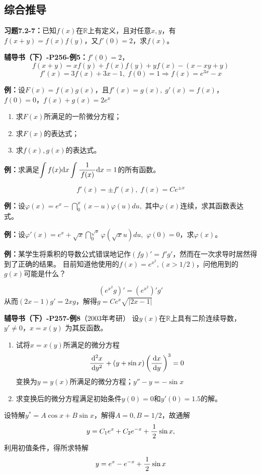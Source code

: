 \subsection{综合推导}

{\bf 习题7.2-7：}已知$f(x)$在$\mathbb{R}$上有定义，且对任意$x,y$，有
$f(x+y)=f(x)f(y)$，又$f'(0)=2$，求$f(x)$。

{\bf 辅导书（下）-P256-例5：}$f'(0)=2$，
$$f(x+y)=xf(y)+f(x)f(y)+yf(x)-(x-xy+y)$$
$$f'(x)=3f(x)+3x-1,\;f(0)=1\Rightarrow f(x)=e^{3x}-x$$

{\bf 例：}设$F(x)=f(x)g(x)$，且$f'(x)=g(x),\;g'(x)=f(x)$，
$f(0)=0$，$f(x)+g(x)=2e^x$
\begin{enumerate}[(1)]
  \setlength{\itemindent}{1cm}
  \item 求$F(x)$所满足的一阶微分方程；
  \item 求$F(x)$的表达式；
  \item 求$f(x),g(x)$的表达式。
\end{enumerate}

{\bf 例：}求满足$\displaystyle\int f(x)\mathrm{d} x\displaystyle\int\displaystyle\frac{\,{1}\,}{\,{f(x)}\,}\mathrm{d} x=1$的所有函数。

$$f'(x)=\pm f'(x),\;f(x)=Ce^{\pm x}$$

{\bf 例：}设$\varphi(x)=e^x-\dint_0^x(x-u)\varphi(u)du,$
其中$\varphi(x)$连续，求其函数表达式。

{\bf 例：}设$\varphi'(x)=e^x+\sqrt x\dint_0^{\sqrt x}\varphi(\sqrt x u)du,$
$\varphi(0)=0$，求$\varphi(x)$。

{\bf 例：}某学生将乘积的导数公式错误地记作$(fg)'=f'g'$，然而在一次求导时居然得到了正确的结果。
目前知道他使用的$f(x)=e^{x^2},(x>1/2)$，问他用到的$g(x)$可能是什么？

$$\left(e^{x^2}g\right)'=\left(e^{x^2}\right)'g'$$
从而$(2x-1)g'=2xg$，解得$g=Ce^x\sqrt{|2x-1|}$

{\bf 辅导书（下）-P257-例8}（2003年考研）
设$y(x)$在$\mathbb{R}$上具有二阶连续导数，$y'\ne 0$，$x=x(y)$
为其反函数。
\begin{enumerate}[(1)]
  \setlength{\itemindent}{1cm}
  \item 试将$x=x(y)$所满足的微分方程
  $$\displaystyle\frac{\,{\mathrm{d}^2x}\,}{\,{\mathrm{d} y^2}\,}+(y+\sin x)\left(\displaystyle\frac{\,{\mathrm{d} x}\,}{\,{\mathrm{d} y}\,}\right)^3=0$$
  变换为$y=y(x)$所满足的微分方程；\hfill$y''-y=-\sin x$
  \item 求变换后的微分方程满足初始条件$y(0)=0$和$y'(0)=1.5$的解。
\end{enumerate}
设特解$y^*=A\cos x+B\sin x$，解得$A=0,B=1/2$，故通解
$$y=C_1e^x+C_2e^{-x}+\displaystyle\frac{\,{1}\,}{\,{2}\,}\sin x,$$
利用初值条件，得所求特解
$$y=e^x-e^{-x}+\displaystyle\frac{\,{1}\,}{\,{2}\,}\sin x$$

